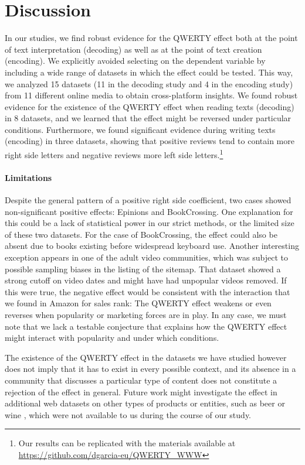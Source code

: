\documentclass[letterpaper]{sig-alternate-2013}
\begin{document}
\section{Discussion}

In our studies, we find robust evidence for the QWERTY effect both at the
point of text interpretation (decoding) as well as at the point of text
creation (encoding). We explicitly avoided selecting on the dependent
variable by including a wide range of datasets in which the effect could be
tested. This way, we analyzed 15 datasets (11 in the decoding study and 4 in
the encoding study) from 11 different online media to obtain cross-platform insights. We found robust evidence for the existence of the
QWERTY effect  when reading texts (decoding) in 8 datasets, and we
learned that the effect might be reversed under particular conditions.
Furthermore, we found significant evidence during writing texts (encoding) in three datasets, showing that
positive reviews tend to contain more right side letters and negative reviews
more left side letters.\footnote{Our results can be replicated with the materials available at \url{https://github.com/dgarcia-eu/QWERTY_WWW}}


\paragraph{Limitations} Despite the general pattern of a positive right side
coefficient, two cases showed non-significant positive effects: Epinions and
BookCrossing. One explanation for this could be a lack of statistical power
in our strict methods, or the limited size of these two datasets. For the case
of BookCrossing, the effect could also be absent due to books existing before
widespread keyboard use. Another interesting exception appears in one of the
adult video communities, which was subject to possible sampling biases in the
listing of the sitemap. That dataset showed a strong cutoff on video dates and
might have had unpopular videos removed. If this were true, the negative
effect would be consistent with the interaction that we found in Amazon for
sales rank: The QWERTY effect weakens or even reverses when popularity or
marketing forces are in play. In any case, we must note that we lack a
testable conjecture that explains how the QWERTY effect might interact with
popularity and under which conditions.

The existence of the QWERTY effect in the datasets we have studied however
does not imply that it has to exist in every possible context, and its absence
in a community that discusses a particular type of content does not
constitute a rejection of the effect in general. Future work might
investigate the effect in additional web datasets on other types of products
or entities, such as beer \cite{Danescu2013} or wine \cite{Mcauley2013}, which
were not available to us during the course of our study.
\end{document}
